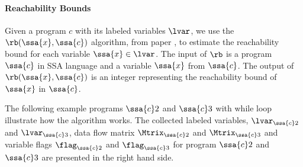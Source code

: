 %
\paragraph{Reachability Bounds}
Given a program $c$ with its labeled variables $\lvar$,
we use the $\rb(\ssa{x}, \ssa{c})$ algorithm, from paper \cite{10.1145/1806596.1806630}, to estimate the reachability bound for each variable $\ssa{x} \in \lvar$. 
The input of $\rb$ is a program $\ssa{c}$ in SSA language and a variable $\ssa{x} $ from $\ssa{c}$.
The output of $\rb(\ssa{x}, \ssa{c})$ is an integer representing the reachability bound of $\ssa{x}$ in $\ssa{c}$.
%

%
The following example programs $\ssa{c}2$ and $\ssa{c}3$ with while loop illustrate how the algorithm works.
The collected labeled variables, $\lvar_{\ssa{c}2}$ and $\lvar_{\ssa{c}3}$,
data flow matrix $\Mtrix_{\ssa{c}2}$ and  $\Mtrix_{\ssa{c}3}$
and variable flags $\flag_{\ssa{c}2}$ and $\flag_{\ssa{c}3}$
for program $\ssa{c}2$ and $\ssa{c}3$
are presented in the right hand side.
%
